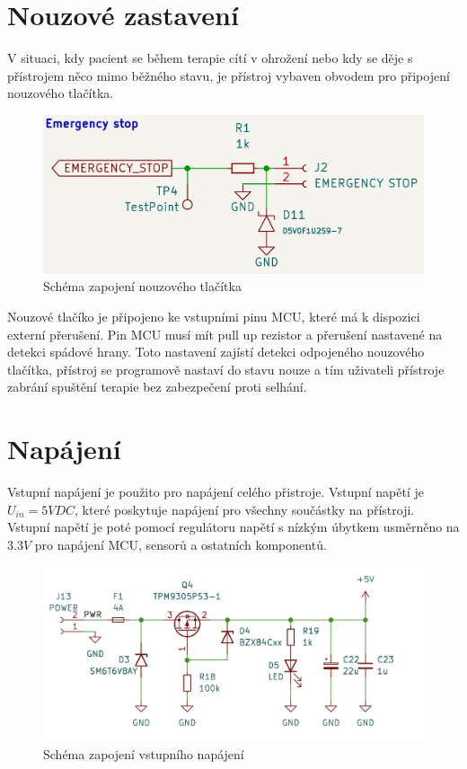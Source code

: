 \section{Nouzové zastavení}
V situaci, kdy pacient se během terapie cítí v ohrožení nebo kdy se děje s přístrojem něco mimo běžného stavu, je přístroj vybaven obvodem pro připojení nouzového tlačítka.
\begin{figure}[H]
    \includegraphics[width=0.9\linewidth]{pictures/e_stop.jpg}
    \caption{Schéma zapojení nouzového tlačítka}
    \label{fig:e_stop}
\end{figure}
Nouzové tlačíko je připojeno ke vstupními pinu MCU, které má k dispozici externí přerušení. Pin MCU musí mít pull up rezistor a přerušení nastavené na detekci spádové hrany. Toto nastavení zajístí
detekci odpojeného nouzového tlačítka, přístroj se programově nastaví do stavu nouze a tím uživateli přístroje zabrání spuštění terapie bez zabezpečení proti selhání.
\section{Napájení}
Vstupní napájení je použito pro napájení celého přistroje. Vstupní napětí je $U_{in} = 5V DC$, které poskytuje napájení pro všechny součástky na přístroji. Vstupní napětí je poté pomocí regulátoru napětí s nízkým úbytkem usměrněno na $3.3 V$ pro napájení MCU, sensorů a ostatních komponentů.

\begin{figure}[H]
    \includegraphics[width=0.9\linewidth]{pictures/power.jpg}
    \caption{Schéma zapojení vstupního napájení}
    \label{fig:power_input}
\end{figure}

